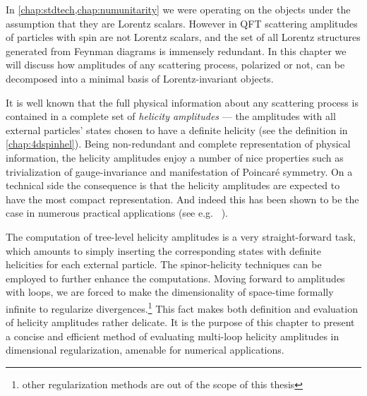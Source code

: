 \newcommand\helampl{\mathcal{A}_{\vb*{\lambda}}}

In \cref{chap:stdtech,chap:numunitarity} we were operating on the objects under the assumption that they are Lorentz scalars.
However in QFT scattering amplitudes of particles with spin are not Lorentz scalars,
and the set of all Lorentz structures generated from Feynman diagrams is immensely redundant.
In this chapter we will discuss how amplitudes of any scattering process, 
polarized or not, can be decomposed into a minimal basis of Lorentz-invariant objects.

It is well known that the full physical information about any scattering process is contained in a complete set of \textit{helicity amplitudes} ---
the amplitudes with all external particles' states chosen to have a definite helicity (see the definition in \cref{chap:4dspinhel}).
Being non-redundant and complete representation of physical information, the helicity amplitudes 
enjoy a number of nice properties such as trivialization of gauge-invariance and manifestation of Poincaré symmetry.
On a technical side the consequence is that the helicity amplitudes are expected to have the most compact representation.
And indeed this has been shown to be the case in numerous practical applications (see e.g.\ %
\cite{DeLaurentis:2019phz,Badger:2019djh,Badger:2011yu,Badger:2013gxa,DeFreitas:2004kmi,Gehrmann:2011aa,Gehrmann:2009vu,Glover:2004si,Glover:2003cm,Garland:2002ak,Dunbar:2016aux,Dunbar:2016gjb,Dunbar:2016cxp,Badger:2015lda,Gehrmann:2015bfy,Bern:2003ck,Bern:2002tk,Badger:2018enw,Dunbar2017,Kunszt:1994nq}).

The computation of tree-level helicity amplitudes is a very straight-forward task,
which amounts to simply inserting the corresponding states with definite helicities for each external particle.
The spinor-helicity techniques can be employed to further enhance the computations.
Moving forward to amplitudes with loops,
we are forced to make the dimensionality of space-time formally infinite \cite{Collins:1984xc} 
to regularize divergences.\footnote{other regularization methods are out of the scope of this thesis}
This fact makes both definition and evaluation of helicity amplitudes rather delicate.
It is the purpose of this chapter to present a concise and efficient method of
evaluating multi-loop helicity amplitudes in dimensional regularization,
amenable for numerical applications.

